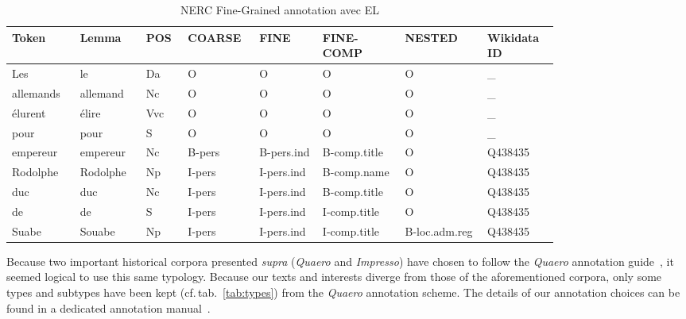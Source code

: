 \begin{table}[!htp]
    \centering\scriptsize
    \begin{tabular}{@{}p{0.1\linewidth}p{0.1\linewidth}p{0.06\linewidth}p{0.08\linewidth}p{0.1\linewidth}p{0.13\linewidth}p{0.13\linewidth}p{0.1\linewidth}@{}}
        \toprule
        Token     & Lemma    & POS & COARSE & FINE       & FINE-COMP    & NESTED        & Wikidata ID \\
        \midrule
        Les       & le       & Da  & O      & O          & O            & O             & \_          \\
        allemands & allemand & Nc  & O      & O          & O            & O             & \_          \\
        élurent   & élire    & Vvc & O      & O          & O            & O             & \_          \\
        pour      & pour     & S   & O      & O          & O            & O             & \_          \\
        empereur  & empereur & Nc  & B-pers & B-pers.ind & B-comp.title & O             & Q438435     \\
        Rodolphe  & Rodolphe & Np  & I-pers & I-pers.ind & B-comp.name  & O             & Q438435     \\
        duc       & duc      & Nc  & I-pers & I-pers.ind & B-comp.title & O             & Q438435     \\
        de        & de       & S   & I-pers & I-pers.ind & I-comp.title & O             & Q438435     \\
        Suabe     & Souabe   & Np  & I-pers & I-pers.ind & I-comp.title & B-loc.adm.reg & Q438435     \\
        \bottomrule
    \end{tabular}
    \caption{NERC Fine-Grained annotation avec EL}
    \label{tab:data}
\end{table}

Because two important historical corpora presented \textit{supra} (\textit{Quaero} and \textit{Impresso}) have chosen to follow the \textit{Quaero} annotation guide~\cite{rosset-etal-2011-entites}, it seemed logical to use this same typology. Because our texts and interests diverge from those of the aforementioned corpora, only some types and subtypes have been kept (cf.\,tab.~\ref{tab:types}) from the \textit{Quaero} annotation scheme. The details of our annotation choices can be found in a dedicated annotation manual~\cite{gabay-etal-2020-manuel}.

